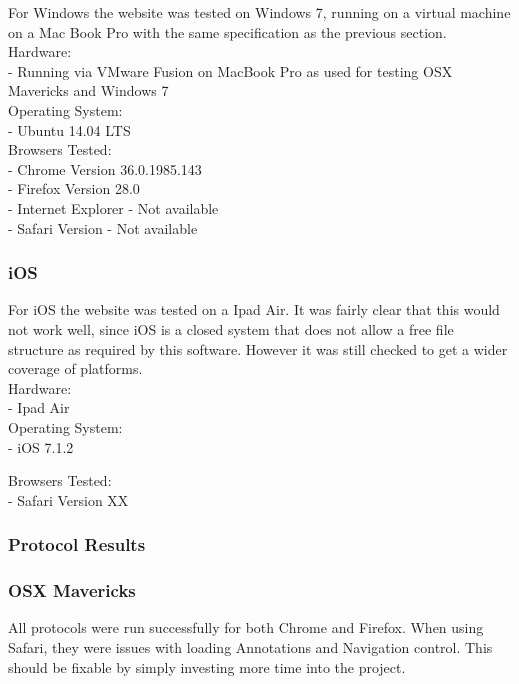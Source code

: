 \documentclass[a4paper,11pt,twoside]{article}
\begin{document}
For Windows the website was tested on Windows 7, running on a virtual machine on a Mac Book Pro with the same specification as the previous section.\\

\noindent Hardware:\\
- Running via VMware Fusion on MacBook Pro as used for testing OSX Mavericks and Windows 7\\

\noindent Operating System:\\
- Ubuntu 14.04 LTS\\

\noindent Browsers Tested:\\
- Chrome Version 36.0.1985.143\\
- Firefox Version 28.0\\
- Internet Explorer - Not available\\
- Safari Version - Not available


\subsubsection*{iOS}

For iOS the website was tested on a Ipad Air. It was fairly clear that this would not work well, since iOS is a closed system that does not allow a free file structure as required by this software. However it was still checked to get a wider coverage of platforms.\\

\noindent Hardware:\\
- Ipad Air\\

\noindent Operating System:\\
- iOS 7.1.2

\noindent Browsers Tested:\\
- Safari Version XX



\subsubsection{Protocol Results}

\subsubsection*{OSX Mavericks}

All protocols were run successfully for both Chrome and Firefox. When using Safari, they were issues with loading Annotations and Navigation control. This should be fixable by simply investing more time into the project.\\
\end{document}
